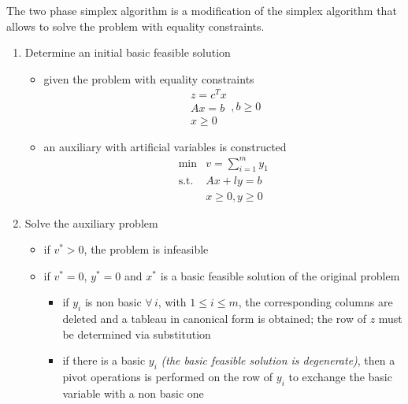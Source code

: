 \documentclass[english]{article}
\begin{document}
The two phase simplex algorithm is a modification of the simplex algorithm that allows to solve the \LP problem with equality
constraints.

\begin{enumerate}[label=\textbf{Phase \arabic*:}, ref=\textbf{Phase \arabic*}]
  \item Determine an initial basic feasible solution
        \begin{itemize}
          \item given the problem with equality constraints
                \[\begin{matrix}
                    z = c^T x \\
                    Ax = b    \\
                    x \geq 0
                  \end{matrix}, b \geq 0\]
          \item an auxiliary \LP with artificial variables is constructed
                \[\begin{matrix}
                    \min        & v = \displaystyle \sum_{i=1}^m y_1 \\
                    \text{s.t.} & Ax + ly = b                        \\
                                & x \geq 0, y \geq 0
                  \end{matrix}\]
        \end{itemize}
  \item Solve the auxiliary problem
        \begin{itemize}
          \item if \(v^\ast > 0\), the problem is infeasible
          \item if \(v^\ast = 0\), \(y^\ast = 0\) and \(x^\ast\) is a basic feasible solution of the original problem
                \begin{itemize}
                  \item if \(y_i\) is non basic \(\forall \, i\), with \(1 \leq i \leq m\), the corresponding columns are deleted and a tableau in canonical form is obtained; the row of \(z\) must be determined via substitution
                  \item if there is a basic \(y_i\) \textit{(the basic feasible solution is degenerate)}, then a pivot operations is performed on the row of \(y_i\) to exchange the basic variable with a non basic one
                \end{itemize}
        \end{itemize}
\end{enumerate}
\end{document}
